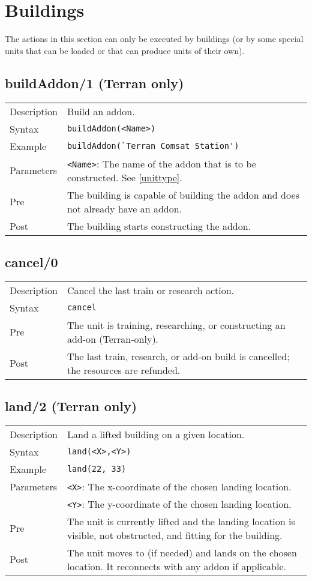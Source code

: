 \section{Buildings}
The actions in this section can only be executed by buildings (or by some special units that can be loaded or that can produce units of their own).

\subsection{buildAddon/1 (Terran only)}
\begin{tabularx}{\textwidth}{lX}
 Description & Build an addon. \\
 Syntax & \verb|buildAddon(<Name>)| \\
 Example & \verb|buildAddon(`Terran Comsat Station')| \\
 Parameters & \verb|<Name>|: The name of the addon that is to be constructed. See \ref{unittype}. \\
 Pre & The building is capable of building the addon and does not already have an addon. \\
 Post & The building starts constructing the addon.
\end{tabularx}

\subsection{cancel/0}
\begin{tabularx}{\textwidth}{lX}
 Description & Cancel the last train or research action. \\
 Syntax & \verb|cancel| \\
 Pre & The unit is training, researching, or constructing an add-on (Terran-only). \\
 Post & The last train, research, or add-on build is cancelled; the resources are refunded.
\end{tabularx}

\subsection{land/2 (Terran only)}
\begin{tabularx}{\textwidth}{lX}
 Description & Land a lifted building on a given location. \\
 Syntax & \verb|land(<X>,<Y>)| \\
 Example & \verb|land(22, 33)| \\
 Parameters & \verb|<X>|: The x-coordinate of the chosen landing location. \\
            & \verb|<Y>|: The y-coordinate of the chosen landing location. \\
 Pre & The unit is currently lifted and the landing location is visible, not obstructed, and fitting for the building. \\
 Post & The unit moves to (if needed) and lands on the chosen location. It reconnects with any addon if applicable.
\end{tabularx}

